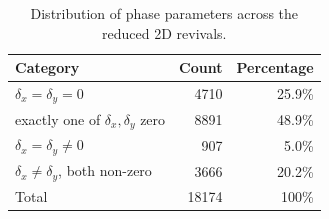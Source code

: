 \begin{table}[htbp]
\centering
\caption{Distribution of phase parameters across the reduced 2D revivals.}
\label{tab:delta-summary}
\begin{tabular}{lrr}
\toprule
Category & Count & Percentage \\
\midrule
$\delta_x = \delta_y = 0$ & 4710 & 25.9\% \\
exactly one of $\delta_x,\delta_y$ zero & 8891 & 48.9\% \\
$\delta_x = \delta_y \neq 0$ & 907 & 5.0\% \\
$\delta_x \neq \delta_y$, both non-zero & 3666 & 20.2\% \\
\midrule
Total & 18174 & 100\% \\
\bottomrule
\end{tabular}
\end{table}
